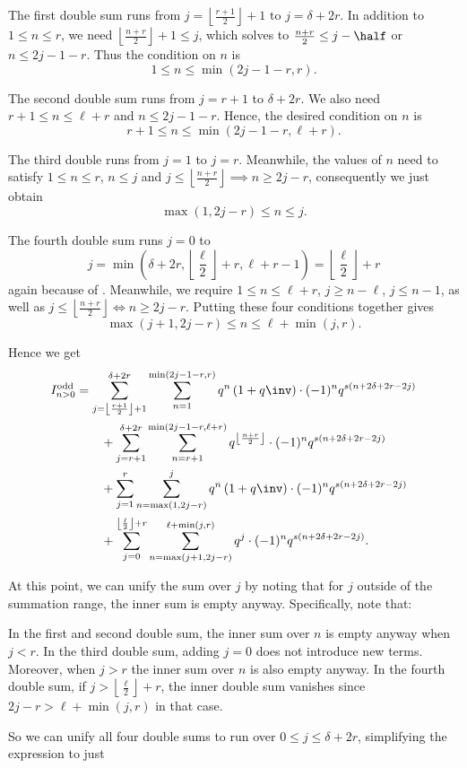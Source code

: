 \begin{itemize}
  \ii The first double sum runs from $j=\left\lfloor \frac{r+1}{2} \right\rfloor+1$ to $j=\delta+2r$.
  In addition to $1 \le n \le r$,
  we need $\left\lfloor \frac{n+r}{2} \right\rfloor + 1 \leq j$,
  which solves to $\frac{n+r}{2} \leq j-\half$ or $n \leq 2j-1-r$.
  Thus the condition on $n$ is
  \[ 1 \leq n \leq \min(2j-1-r, r). \]

  \ii The second double sum runs from $j=r+1$ to $\delta+2r$.
  We also need $r+1 \le n \le \ell+r$ and $n \le 2j-1-r$.
  Hence, the desired condition on $n$ is
  \[ r+1 \leq n \leq \min(2j-1-r, \ell+r). \]

  \ii The third double runs from $j=1$ to $j=r$.
  Meanwhile, the values of $n$ need to satisfy $1 \le n \le r$, $n \leq j$
  and $j \leq \left\lfloor \frac{n+r}{2} \right\rfloor \implies n \geq 2j-r$,
  consequently we just obtain
  \[ \max(1, 2j-r) \leq n \leq j. \]

  \ii The fourth double sum runs $j=0$ to
  \[ j=\min\left( \delta+2r, \left\lfloor \frac{\ell}{2} \right\rfloor + r, \ell+r-1 \right)
    = \left\lfloor \frac{\ell}{2} \right\rfloor + r \]
  again because of .
  Meanwhile, we require $1 \le n \le \ell+r$, $j \ge n-\ell$, $j \le n-1$,
  as well as $j \le \left\lfloor \frac{n+r}{2} \right\rfloor
  \iff n \ge 2j-r$.
  Putting these four conditions together gives
  \[ \max(j+1, 2j-r) \le n \le \ell+\min(j,r). \]
\end{itemize}
Hence we get
\begin{align*}
  I_{n > 0}^{\text{odd}}
  &= \sum_{j = \left\lfloor \frac{r+1}{2} \right\rfloor+ 1}^{\delta+2r}
    \sum_{n=1}^{\min(2j-1-r, r)}
    q^{n} \left( 1 + q\inv \right) \cdot (-1)^n q^{s(n+2\delta+2r-2j)} \\
  &\qquad+ \sum_{j = r+1}^{\delta + 2r}
    \sum_{n=r+1}^{\min(2j-1-r, \ell+r)}
    q^{\left\lfloor \frac{n+r}{2} \right\rfloor} \cdot (-1)^n q^{s(n+2\delta+2r-2j)} \\
  &\qquad+ \sum_{j=1}^{r}
    \sum_{n=\max(1,2j-r)}^{j}
    q^{n} \left( 1 + q\inv \right) \cdot (-1)^n q^{s(n+2\delta+2r-2j)} \\
  &\qquad+ \sum_{j=0}^{\left\lfloor \frac{\ell}{2} \right\rfloor + r}
    \sum_{n=\max(j+1, 2j-r)}^{\ell+\min(j,r)}
    q^{j} \cdot (-1)^n q^{s(n+2\delta+2r-2j)}.
\end{align*}

At this point, we can unify the sum over $j$ by noting that for $j$ outside of the
summation range, the inner sum is empty anyway.
Specifically, note that:
\begin{itemize}
  \ii In the first and second double sum,
  the inner sum over $n$ is empty anyway when $j < r$.
  \ii In the third double sum, adding $j=0$ does not introduce new terms.
  Moreover, when $j > r$ the inner sum over $n$ is also empty anyway.
  \ii In the fourth double sum, if $j > \left\lfloor \frac{\ell}{2} \right\rfloor + r$,
  the inner double sum vanishes since $2j-r > \ell + \min(j,r)$ in that case.
\end{itemize}
So we can unify all four double sums to run over $0 \le j \le \delta + 2r$,
simplifying the expression to just

